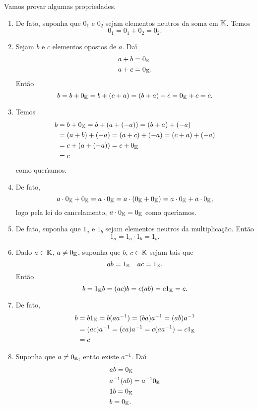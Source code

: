 \begin{prova}
	Vamos provar algumas propriedades.
	\begin{enumerate}[label={\roman*})]
		\item De fato, suponha que $0_1$ e $0_2$ sejam elementos neutros da soma em $\mathbb{K}$. Temos
		\[
			0_1 = 0_1 + 0_2 = 0_2.
		\]

		\item Sejam $b$ e $c$ elementos opostos de $a$. Da{\'\i}
		\begin{align*}
			a + b &= 0_{\mathbb{K}}\\
			a + c &= 0_{\mathbb{K}}.
		\end{align*}
	 	Ent\~ao
		\[
			b = b + 0_{\mathbb{K}} = b + (c + a) = (b + a) + c = 0_{\mathbb{K}} + c = c.
		\]

		\item Temos
		\begin{align*}
			b &= b + 0_{\mathbb{K}} = b + (a + (-a)) = (b + a) + (-a) \\ &= (a + b) + (-a) = (a + c) + (-a) = (c + a) + (-a) \\ &= c + (a + (-a)) = c + 0_{\mathbb{K}} \\ &= c
		\end{align*}
		como quer{\'\i}amos.

		\item De fato,
		\[
			a\cdot 0_{\mathbb{K}} + 0_{\mathbb{K}} = a\cdot 0_{\mathbb{K}} = a\cdot (0_{\mathbb{K}} + 0_{\mathbb{K}}) = a\cdot 0_{\mathbb{K}} + a\cdot 0_{\mathbb{K}},
		\]
		logo pela lei do cancelamento, $a\cdot 0_{\mathbb{K}} = 0_{\mathbb{K}}$ como quer{\'\i}amos.


		\item
		De fato, suponha que $1_a$ e $1_b$ sejam elementos neutros da multiplica\c{c}\~ao. Ent\~ao
		\[
			1_a = 1_a\cdot 1_b = 1_b.
		\]

		\item Dado $a \in \mathbb{K}$, $a \ne 0_{\mathbb{K}}$, suponha que $b$, $c \in \mathbb{K}$ sejam tais que
		\[
			ab = 1_{\mathbb{K}} \quad ac = 1_{\mathbb{K}}.
		\]
		Ent\~ao
		\[
			b = 1_{\mathbb{K}}b = (ac)b = c(ab) = c1_{\mathbb{K}} = c.
		\]

		\item De fato,
		\begin{align*}
			b &= b1_{\mathbb{K}} = b(aa^{-1}) = (ba)a^{-1} = (ab)a^{-1} \\ &= (ac)a^{-1} = (ca)a^{-1} = c(aa^{-1}) = c1_{\mathbb{K}} \\ &= c
		\end{align*}

		\item
		Suponha que $a \ne 0_{\mathbb{K}}$, ent\~ao existe $a^{-1}$. Da{\'\i}
		\begin{align*}
			&ab = 0_{\mathbb{K}}\\
			&a^{-1}(ab) = a^{-1}0_{\mathbb{K}}\\
			&1b = 0_{\mathbb{K}}\\
			&b = 0_{\mathbb{K}}.
		\end{align*}
	\end{enumerate}
\end{prova}


